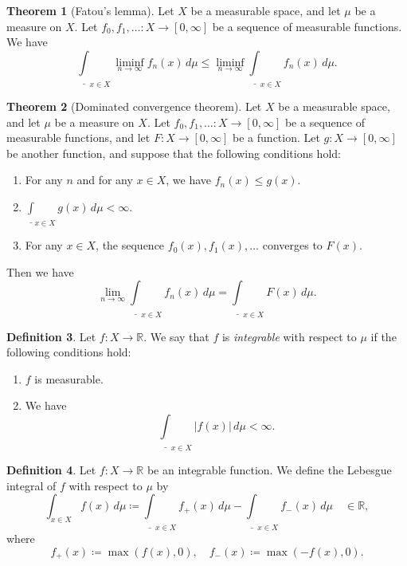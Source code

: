 \documentclass{article}
\theoremstyle{definition}
\newtheorem{theorem}{Theorem}[section]
\newtheorem{definition}[theorem]{Definition}
\begin{document}
\begin{theorem}[Fatou's lemma]
  Let $X$ be a measurable space,
  and let $\mu$ be a measure on $X$.
  Let $f_0, f_1, \dots : X \to [0, \infty]$ be
  a sequence of measurable functions.
  We have
  \begin{equation*}
    \underline{\int}_{x \in X} \liminf_{n \to \infty} f_n (x) \, d\mu
      \leq \liminf_{n \to \infty} \underline{\int}_{x \in X} f_n (x) \, d\mu.
  \end{equation*}
\end{theorem}

\begin{theorem}[Dominated convergence theorem]
  Let $X$ be a measurable space,
  and let $\mu$ be a measure on $X$.
  Let $f_0, f_1, \dots : X \to [0, \infty]$ be
  a sequence of measurable functions,
  and let $F : X \to [0, \infty]$ be a function.
  Let $g : X \to [0, \infty]$ be another function, and 
  suppose that the following conditions hold:
  \begin{enumerate}
    \item For any $n$ and for any $x \in X$,
      we have $f_n (x) \leq g (x)$.
    \item $\underline{\int}_{x \in X} g (x) \, d\mu < \infty$.
    \item For any $x \in X$,
      the sequence $f_0 (x), f_1 (x), \dots$ converges to $F (x)$.
  \end{enumerate}
  Then we have
  \begin{equation*}
    \lim_{n \to \infty} \underline{\int}_{x \in X} f_n (x) \, d\mu
      = \underline{\int}_{x \in X} F (x) \, d\mu.
  \end{equation*}
\end{theorem}

\begin{definition}
  Let $f : X \to \mathbb{R}$.
  We say that $f$ is \emph{integrable} with respect to $\mu$ 
  if the following conditions hold:
  \begin{enumerate}
    \item $f$ is measurable.
    \item We have
    \begin{equation*}
      \underline{\int}_{x \in X} \lvert f (x) \rvert \, d\mu < \infty.
    \end{equation*}
  \end{enumerate}
\end{definition}

\begin{definition}
  Let $f : X \to \mathbb{R}$ be an integrable function.
  We define the Lebesgue integral of $f$ with respect to $\mu$ by
  \begin{equation*}
    \int_{x \in X} f (x) \, d\mu 
      \coloneqq \underline{\int}_{x \in X} f_+ (x) \, d\mu
        - \underline{\int}_{x \in X} f_- (x) \, d\mu \quad \in \mathbb{R},
  \end{equation*}
  where
  \begin{equation*}
    f_+ (x) \coloneqq \max (f(x), 0), \quad
    f_- (x) \coloneqq \max (-f(x), 0).
  \end{equation*}
\end{definition}
\end{document}
